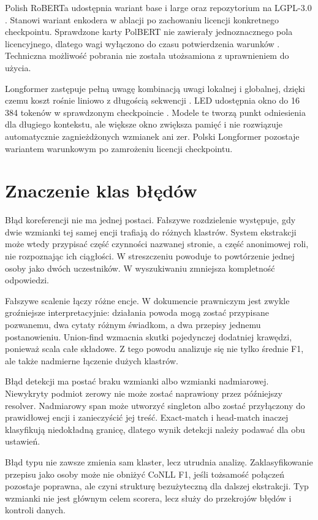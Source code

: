 Polish RoBERTa udostępnia wariant base i large oraz repozytorium na LGPL-3.0 \cite{dadas_2020_roberta}. Stanowi wariant enkodera w ablacji po zachowaniu licencji konkretnego checkpointu. Sprawdzone karty PolBERT nie zawierały jednoznacznego pola licencyjnego, dlatego wagi wyłączono do czasu potwierdzenia warunków \cite{kleczek_2020_polbert}. Techniczna możliwość pobrania nie została utożsamiona z uprawnieniem do użycia.

Longformer zastępuje pełną uwagę kombinacją uwagi lokalnej i globalnej, dzięki czemu koszt rośnie liniowo z długością sekwencji \cite{beltagy_2020_longformer}. LED udostępnia okno do 16\,384 tokenów w sprawdzonym checkpoincie \cite{allenai_2026_led}. Modele te tworzą punkt odniesienia dla długiego kontekstu, ale większe okno zwiększa pamięć i nie rozwiązuje automatycznie zagnieżdżonych wzmianek ani zer. Polski Longformer pozostaje wariantem warunkowym po zamrożeniu licencji checkpointu.

\section{Znaczenie klas błędów}
\label{sec:bledy-prawne}

Błąd koreferencji nie ma jednej postaci. Fałszywe rozdzielenie występuje, gdy dwie wzmianki tej samej encji trafiają do różnych klastrów. System ekstrakcji może wtedy przypisać część czynności nazwanej stronie, a część anonimowej roli, nie rozpoznając ich ciągłości. W streszczeniu powoduje to powtórzenie jednej osoby jako dwóch uczestników. W wyszukiwaniu zmniejsza kompletność odpowiedzi.

Fałszywe scalenie łączy różne encje. W dokumencie prawniczym jest zwykle groźniejsze interpretacyjnie: działania powoda mogą zostać przypisane pozwanemu, dwa cytaty różnym świadkom, a dwa przepisy jednemu postanowieniu. Union-find wzmacnia skutki pojedynczej dodatniej krawędzi, ponieważ scala całe składowe. Z tego powodu analizuje się nie tylko średnie F1, ale także nadmierne łączenie dużych klastrów.

Błąd detekcji ma postać braku wzmianki albo wzmianki nadmiarowej. Niewykryty podmiot zerowy nie może zostać naprawiony przez późniejszy resolver. Nadmiarowy span może utworzyć singleton albo zostać przyłączony do prawidłowej encji i zanieczyścić jej treść. Exact-match i head-match inaczej klasyfikują niedokładną granicę, dlatego wynik detekcji należy podawać dla obu ustawień.

Błąd typu nie zawsze zmienia sam klaster, lecz utrudnia analizę. Zaklasyfikowanie przepisu jako osoby może nie obniżyć CoNLL F1, jeśli tożsamość połączeń pozostaje poprawna, ale czyni strukturę bezużyteczną dla dalszej ekstrakcji. Typ wzmianki nie jest głównym celem scorera, lecz służy do przekrojów błędów i kontroli danych.

